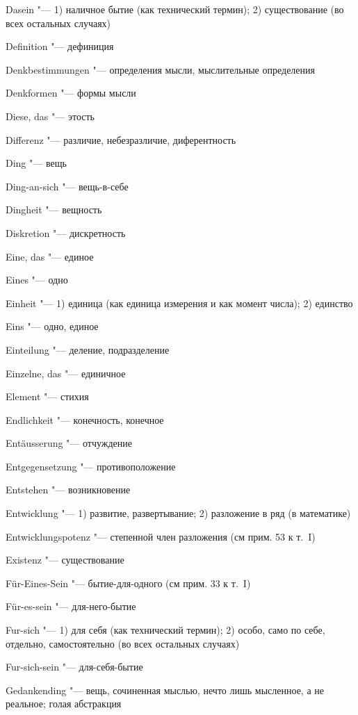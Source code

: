 {{\begin{multicols}{2}
\bigskip

Dasein "--- 1) наличное бытие (как технический термин); 2)
существование (во всех остальных случаях)

Definition "--- дефиниция

Denkbestimmungen "--- определения мысли, мыслительные определения

Denkformen "--- формы мысли

Diese, das "--- этость

Differenz "--- различие, небезразличие, диферентность

Ding "--- вещь

Ding-an-sich "--- вещь-в-себе

Dingheit "--- вещность

Diskretion "--- дискретность

\bigskip

Eine, das "--- единое

Eines "--- одно

Einheit "--- 1) единица (как единица измерения и как момент
числа); 2) единство

Eins "--- одно, единое

Einteilung "--- деление, подразделение

Einzelne, das "--- единичное

Element "--- стихия

Endlichkeit "--- конечность, конечное

Entäusserung "--- отчуждение

Entgegensetzung "--- противоположение

Entstehen "--- возникновение

Entwicklung "--- 1) развитие, развертывание; 2) разложение в ряд (в математике)

Entwicklungspotenz "--- степенной член разложения (см прим. 53 к т.~I)

Existenz "--- существование

\bigskip

Für-Eines-Sein "--- бытие-для-одного (см прим. 33 к т.~I)

Für-es-sein "--- для-него-бытие

Fur-sich "--- 1) для себя (как технический термин); 2) особо,
само по себе, отдельно, самостоятельно (во всех остальных случаях)

Fur-sich-sein "--- для-себя-бытие

\bigskip

Gedankending "--- вещь, сочиненная мыслью, нечто лишь мысленное,
а не реальное; голая абстракция


\end{multicols}}}

